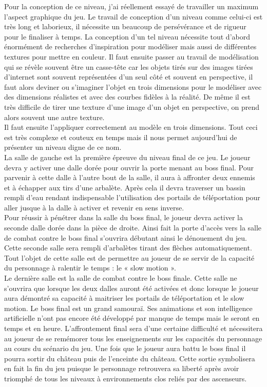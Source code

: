 \documentclass[12pt]{article}
\begin{document}
Pour la conception de ce niveau, j'ai réellement essayé de travailler un maximum l'aspect graphique du jeu. Le travail de conception d'un niveau comme celui-ci est très long et laborieux, il nécessite un beaucoup de persévérance et de rigueur pour le finaliser à temps. La conception d'un tel niveau nécessite tout d'abord énormément de recherches d'inspiration pour modéliser mais aussi de différentes textures pour mettre en couleur. Il faut ensuite passer au travail de modélisation qui se révèle souvent être un casse-tête car les objets tirés sur des images tirées d'internet sont souvent représentées d'un seul côté et souvent en perspective, il faut alors deviner ou s'imaginer l'objet en trois dimensions pour le modéliser avec des dimensions réalistes et avec des courbes fidèles à la réalité. De même il est très difficile de tirer une texture d'une image d'un objet en perspective, on prend alors souvent une autre texture.\\
Il faut ensuite l'appliquer correctement au modèle en trois dimensions. Tout ceci est très complexe et couteux en temps mais il nous permet aujourd'hui de présenter un niveau digne de ce nom.\\

La salle de gauche est la première épreuve du niveau final de ce jeu. Le joueur devra y activer une dalle dorée pour ouvrir la porte menant au boss final. Pour parvenir à cette dalle à l'autre bout de la salle, il aura à affronter deux ennemis et à échapper aux tirs d'une arbalète. Après cela il devra traverser un bassin rempli d'eau rendant indispensable l'utilisation des portails de téléportation pour aller jusque à la dalle à activer et revenir en sens inverse.\\
Pour réussir à pénétrer dans la salle du boss final, le joueur devra activer la seconde dalle dorée dans la pièce de droite. Ainsi fait la porte d'accès vers la salle de combat contre le boss final s'ouvrira débutant ainsi le dénouement du jeu. Cette seconde salle sera rempli d'arbalètes tirant des flèches automatiquement. Tout l'objet de cette salle est de permettre au joueur de se servir de la capacité du personnage à ralentir le temps : le « slow motion ».\\
Le dernière salle est la salle de combat contre le boss finale. Cette salle ne s'ouvrira que lorsque les deux dalles auront été activées et donc lorsque le joueur aura démontré sa capacité à maitriser les portails de téléportation et le slow motion. Le boss final est un grand samouraï. Ses animations et son intelligence artificielle n'ont pas encore été développé par manque de temps mais le seront en temps et en heure. L'affrontement final sera d'une certaine difficulté et nécessitera au joueur de se remémorer tous les enseignements sur les capacités du personnage au cours du scénario du jeu. Une fois que le joueur aura battu le boss final il pourra sortir du château puis de l'enceinte du château. Cette sortie symbolisera en fait la fin du jeu puisque le personnage retrouvera sa liberté après avoir triomphé de tous les niveaux à environnements clos reliés par des ascenseurs.
\end{document}
